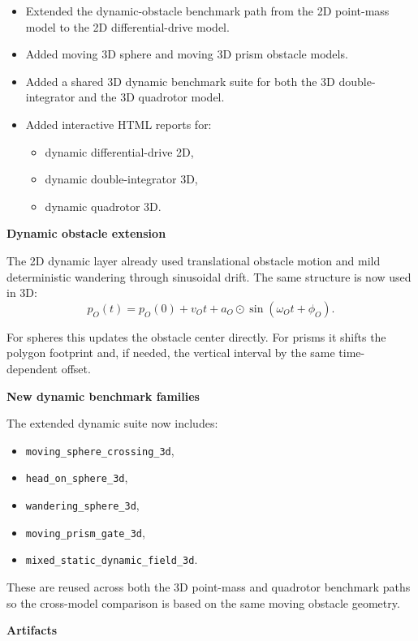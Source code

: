\documentclass[11pt]{article}
\begin{document}
\begin{itemize}[leftmargin=*]
  \item Extended the dynamic-obstacle benchmark path from the 2D point-mass model to the 2D differential-drive model.
  \item Added moving 3D sphere and moving 3D prism obstacle models.
  \item Added a shared 3D dynamic benchmark suite for both the 3D double-integrator and the 3D quadrotor model.
  \item Added interactive HTML reports for:
  \begin{itemize}[leftmargin=*]
    \item dynamic differential-drive 2D,
    \item dynamic double-integrator 3D,
    \item dynamic quadrotor 3D.
  \end{itemize}
\end{itemize}

\textbf{Dynamic obstacle extension}

The 2D dynamic layer already used translational obstacle motion and mild
deterministic wandering through sinusoidal drift. The same structure is now used
in 3D:
\[
p_O(t) = p_O(0) + v_O t + a_O \odot \sin(\omega_O t + \phi_O) .
\]

For spheres this updates the obstacle center directly. For prisms it shifts the
polygon footprint and, if needed, the vertical interval by the same
time-dependent offset.

\textbf{New dynamic benchmark families}

The extended dynamic suite now includes:
\begin{itemize}[leftmargin=*]
  \item \texttt{moving\_sphere\_crossing\_3d},
  \item \texttt{head\_on\_sphere\_3d},
  \item \texttt{wandering\_sphere\_3d},
  \item \texttt{moving\_prism\_gate\_3d},
  \item \texttt{mixed\_static\_dynamic\_field\_3d}.
\end{itemize}

These are reused across both the 3D point-mass and quadrotor benchmark paths so
the cross-model comparison is based on the same moving obstacle geometry.

\textbf{Artifacts}
\end{document}
